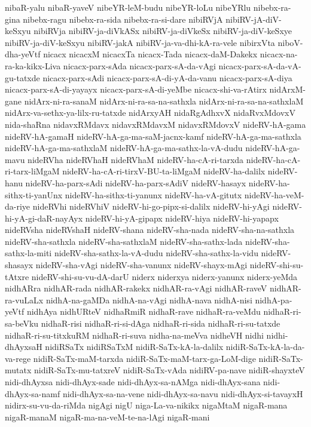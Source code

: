 {nibaR-yalu
nibaR-yaveV
nibeYR-leM-budu
nibeYR-loLu
nibeYRlu
nibebx-ra-gina
nibebx-ragu
nibebx-ra-sida
nibebx-ra-si-dare
nibiRVjA
nibiRV-jA-diV-keSxyu
nibiRVja
nibiRV-ja-diVkASx
nibiRV-ja-diVkeSx
nibiRV-ja-diV-keSxye
nibiRV-ja-diV-keSxyu
nibiRV-jakA
nibiRV-ja-va-dhi-kA-ra-vele
nibirxVta
niboV-dha-yeVtf
nicacx
nicacxM
nicacxTa
nicacx-Tada
nicacx-daM-Dakekx
nicacx-na-ra-ka-kikx-Liva
nicacx-parx-sAda
nicacx-parx-sA-da-vAgi
nicacx-parx-sA-da-vA-gu-tatxde
nicacx-parx-sAdi
nicacx-parx-sA-di-yA-da-vanu
nicacx-parx-sA-diya
nicacx-parx-sA-di-yayayx
nicacx-parx-sA-di-yeMbe
nicacx-shi-va-rAtirx
nidArxM-gane
nidArx-ni-ra-sanaM
nidArx-ni-ra-sa-na-sathxla
nidArx-ni-ra-sa-na-sathxlaM
nidArx-va-sethx-ya-lilx-ru-tatxde
nidArxyAH
nidaRgAdhxvX
nidaRvxMdovxV
nida-shaRna
nidavxRMdavx
nidavxRMdavxM
nidavxRMdovxV
nideRV-hA-gama
nideRV-hA-gamaH
nideRV-hA-ga-ma-saM-jacnx-kamf
nideRV-hA-ga-ma-sathxla
nideRV-hA-ga-ma-sathxlaM
nideRV-hA-ga-ma-sathx-la-vA-dudu
nideRV-hA-ga-mavu
nideRVha
nideRVhaH
nideRVhaM
nideRV-ha-cA-ri-tarxda
nideRV-ha-cA-ri-tarx-liMgaM
nideRV-ha-cA-ri-tirxV-BU-ta-liMgaM
nideRV-ha-dalilx
nideRV-hanu
nideRV-ha-parx-sAdi
nideRV-ha-parx-sAdiV
nideRV-hasayx
nideRV-ha-sithx-ti-yanUnx
nideRV-ha-sithx-ti-yanunx
nideRV-ha-vA-gitutx
nideRV-ha-veM-da-riye
nideRVhi
nideRVhiV
nideRV-hi-go-pipx-si-dalilx
nideRV-hi-yAgi
nideRV-hi-yA-gi-daR-nayAyx
nideRV-hi-yA-gipapx
nideRV-hiya
nideRV-hi-yapapx
nideRVsha
nideRVshaH
nideRV-shana
nideRV-sha-nada
nideRV-sha-na-sathxla
nideRV-sha-sathxla
nideRV-sha-sathxlaM
nideRV-sha-sathx-lada
nideRV-sha-sathx-la-miti
nideRV-sha-sathx-la-vA-dudu
nideRV-sha-sathx-la-vidu
nideRV-shasayx
nideRV-sha-vAgi
nideRV-sha-vanunx
nideRV-shayx-mAgi
nideRV-shi-su-tAtxre
nideRV-shi-su-vu-dA-darU
niderx
niderxya
niderx-yanunx
niderx-yeMda
nidhARra
nidhAR-rada
nidhAR-rakekx
nidhAR-ra-vAgi
nidhAR-raveV
nidhAR-ra-vuLaLx
nidhA-na-gaMDa
nidhA-na-vAgi
nidhA-nava
nidhA-nisi
nidhA-pa-yeVtf
nidhAya
nidhURteV
nidhaRmiR
nidhaR-rave
nidhaR-ra-veMdu
nidhaR-ri-sa-beVku
nidhaR-risi
nidhaR-ri-si-dAga
nidhaR-ri-sida
nidhaR-ri-su-tatxde
nidhaR-ri-su-titxkuRM
nidhaR-ri-suva
nidha-na-meVva
nidheVH
nidhi
nidhi-dhAyxsaH
nidiRSaTx
nidiRSaTxM
nidiR-SaTx-kA-la-dalilx
nidiR-SaTx-kA-la-da-va-rege
nidiR-SaTx-maM-tarxda
nidiR-SaTx-maM-tarx-ga-LoM-dige
nidiR-SaTx-mutatx
nidiR-SaTx-mu-tatxreV
nidiR-SaTx-vAda
nidiRV-pa-nave
nidiR-shayxteV
nidi-dhAyxsa
nidi-dhAyx-sade
nidi-dhAyx-sa-nAMga
nidi-dhAyx-sana
nidi-dhAyx-sa-namf
nidi-dhAyx-sa-na-vene
nidi-dhAyx-sa-navu
nidi-dhAyx-si-tavayxH
nidirx-su-vu-da-riMda
nigAgi
nigU
niga-La-va-nikikx
nigaMtaM
nigaR-mana
nigaR-manaM
nigaR-ma-na-veM-te-na-lAgi
nigaR-mani
}
